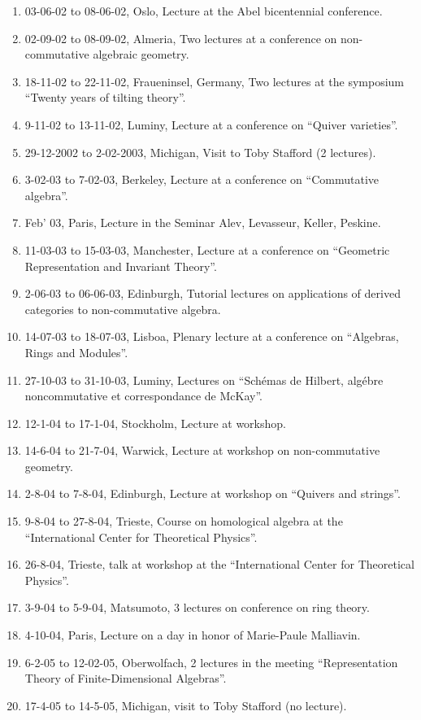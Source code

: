 \documentclass{amsart}
\begin{document}
\begin{enumerate}
\item 03-06-02 to 08-06-02, Oslo, Lecture at the Abel bicentennial 
conference.
\item 02-09-02 to 08-09-02, Almeria, Two lectures at a conference
on non-commutative algebraic geometry.
\item 18-11-02 to 22-11-02, Fraueninsel, Germany, Two lectures
at the symposium ``Twenty years of tilting theory''.
\item 9-11-02 to 13-11-02, Luminy, Lecture at a conference on
``Quiver varieties''.
\item 29-12-2002 to 2-02-2003, Michigan, Visit to Toby Stafford (2 lectures). 
\item 3-02-03 to 7-02-03, Berkeley, Lecture at a conference on
``Commutative algebra''.
\item Feb' 03, Paris, Lecture in the Seminar Alev, Levasseur, Keller, Peskine.
\item 11-03-03 to 15-03-03, Manchester, Lecture at a conference on
  ``Geometric Representation and Invariant Theory''.
\item 2-06-03 to 06-06-03, Edinburgh, Tutorial lectures on applications
of derived categories to non-commutative algebra.
\item 14-07-03 to 18-07-03, Lisboa, Plenary lecture at a conference
  on ``Algebras, Rings and Modules''.
\item 27-10-03 to 31-10-03, Luminy, Lectures on ``Sch\'emas de Hilbert,
  alg\'ebre noncommutative et correspondance de McKay''.
\item 12-1-04 to 17-1-04, Stockholm, Lecture at workshop.
\item 14-6-04 to 21-7-04, Warwick, Lecture at workshop on non-commutative
geometry.
\item 2-8-04 to 7-8-04, Edinburgh, Lecture at workshop on ``Quivers and strings''.
\item 9-8-04 to 27-8-04, Trieste, Course on homological algebra at the
``International Center for Theoretical Physics''.
\item 26-8-04, Trieste, talk at workshop at the ``International Center for Theoretical Physics''.
\item 3-9-04 to 5-9-04, Matsumoto, 3 lectures on conference on ring theory.
\item 4-10-04, Paris, Lecture on a day in honor of Marie-Paule Malliavin.
\item 6-2-05 to 12-02-05, Oberwolfach, 2 lectures in the meeting ``Representation Theory of Finite-Dimensional Algebras''.
\item 17-4-05 to 14-5-05, Michigan, visit to Toby Stafford (no lecture).

\end{enumerate}
\end{document}

